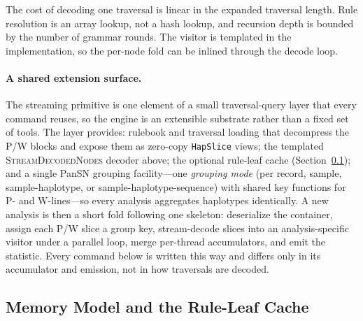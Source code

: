 The cost of decoding one traversal is linear in the expanded traversal length.
Rule resolution is an array lookup, not a hash lookup, and recursion depth is
bounded by the number of grammar rounds. The visitor is templated in the
implementation, so the per-node fold can be inlined through the decode loop.

\paragraph{A shared extension surface.}
The streaming primitive is one element of a small traversal-query layer that every
command reuses, so the engine is an extensible substrate rather than a fixed set
of tools. The layer provides: rulebook and traversal loading that decompress the
P/W blocks and expose them as zero-copy \texttt{HapSlice} views; the templated
\textsc{StreamDecodedNodes} decoder above; the optional rule-leaf cache
(Section~\ref{subsec:ce-memory}); and a single PanSN grouping facility---one
\emph{grouping mode} (per record, sample, sample-haplotype, or
sample-haplotype-sequence) with shared key functions for P- and W-lines---so every
analysis aggregates haplotypes identically. A new analysis is then a short fold
following one skeleton: deserialize the container, assign each P/W slice a group
key, stream-decode slices into an analysis-specific visitor under a parallel loop,
merge per-thread accumulators, and emit the statistic. Every command below is
written this way and differs only in its accumulator and emission, not in how
traversals are decoded.

\subsection{Memory Model and the Rule-Leaf Cache}\label{subsec:ce-memory}

